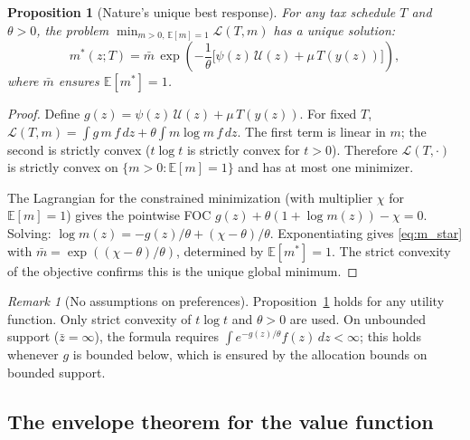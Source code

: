 \documentclass[12pt,a4paper]{article}
\theoremstyle{definition}
\theoremstyle{plain}
\newtheorem{proposition}{Proposition}[section]
\theoremstyle{remark}
\newtheorem{remark}{Remark}[section]
\newcommand{\E}{\mathbb{E}}
\newcommand{\zbar}{\bar{z}}
\newcommand{\calU}{\mathcal{U}}
\newcommand{\calL}{\mathcal{L}}
\begin{document}
\begin{proposition}[Nature's unique best response]
\label{prop:nature_br}
For any tax schedule $T$ and $\theta > 0$, the problem
$\min_{m > 0,\,\E[m]=1} \calL(T, m)$ has a unique
solution:
\begin{equation}
\label{eq:m_star}
  \boxed{
  m^*(z; T) = \bar{m}\,\exp\!\left(
    -\frac{1}{\theta}\bigl[\psi(z)\,\calU(z)
    + \mu\,T(y(z))\bigr]\right),
  }
\end{equation}
where $\bar{m}$ ensures $\E[m^*] = 1$.
\end{proposition}

\begin{proof}
Define $g(z) = \psi(z)\,\calU(z) + \mu\,T(y(z))$.
For fixed $T$, $\calL(T, m) = \int g\,m\,f\,dz
+ \theta\!\int m\log m\,f\,dz$.
The first term is linear in $m$; the second is strictly
convex ($t \log t$ is strictly convex for $t > 0$).
Therefore $\calL(T, \cdot)$ is strictly convex on
$\{m > 0 : \E[m] = 1\}$ and has at most one minimizer.

The Lagrangian for the constrained minimization (with
multiplier $\chi$ for $\E[m] = 1$) gives the pointwise FOC
$g(z) + \theta(1 + \log m(z)) - \chi = 0$.  Solving:
$\log m(z) = -g(z)/\theta + (\chi - \theta)/\theta$.
Exponentiating gives \eqref{eq:m_star} with
$\bar{m} = \exp((\chi-\theta)/\theta)$, determined by
$\E[m^*] = 1$.  The strict convexity of the objective
confirms this is the unique global minimum.
\end{proof}

\begin{remark}[No assumptions on preferences]
\label{rem:nature_general}
Proposition~\ref{prop:nature_br} holds for any utility
function.  Only strict convexity of $t\log t$ and
$\theta > 0$ are used.  On unbounded support
($\zbar = \infty$), the formula requires
$\int e^{-g(z)/\theta}f(z)\,dz < \infty$; this holds
whenever $g$ is bounded below, which is ensured by the
allocation bounds on bounded support.
\end{remark}


\subsection{The envelope theorem for the value function}
\label{sec:envelope}
\end{document}
